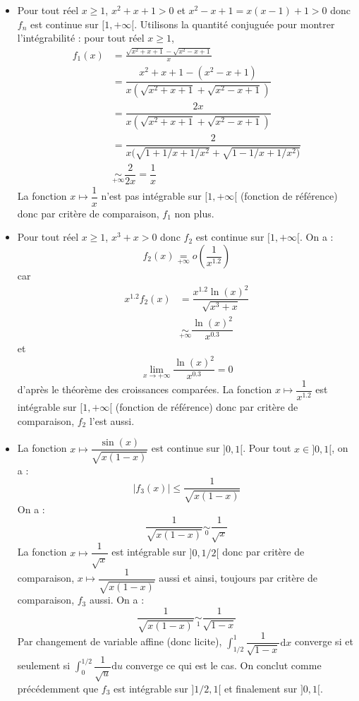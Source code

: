 \documentclass[a4paper,twoside,french,10pt]{VcCours}
\newcommand{\dx}{\text{d}x}
\begin{document}
\begin{itemize}
\item Pour tout réel $x \geq 1$, $x^2+x+1 > 0$ et $x^2-x+1=x(x-1)+1 >0$ donc $f_n$ est continue sur $[1, + \infty[$. Utilisons la quantité conjuguée pour montrer l'intégrabilité : pour tout réel $x \geq 1$,
\begin{align*}
f_1(x) & =\frac{\sqrt{x^2+x+1}-\sqrt{x^2-x+1}}{x} \\
& = \dfrac{x^2+x+1-(x^2-x+1)}{x(\sqrt{x^2+x+1}+\sqrt{x^2-x+1})} \\
& = \dfrac{2x}{x(\sqrt{x^2+x+1}+\sqrt{x^2-x+1})} \\
& = \dfrac{2}{x(\sqrt{1+1/x+1/x^2}+ \sqrt{1-1/x+1/x^2)}} \\
& \underset{+ \infty}{\sim} \dfrac{2}{2x} = \dfrac{1}{x}
\end{align*}
La fonction $x \mapsto \dfrac{1}{x}$ n'est pas intégrable sur $[1, + \infty[$ (fonction de référence) donc par critère de comparaison, $f_1$ non plus.
\item Pour tout réel $x \geq 1$, $x^3+x>0$ donc $f_2$ est continue sur $[1, + \infty[$. On a :
$$ f_2(x) \underset{+\infty}{=} o \left( \dfrac{1}{x^{1.2}} \right)$$
car 
\begin{align*}
x^{1.2} f_2(x) & = \dfrac{x^{1.2} \ln(x)^2}{\sqrt{x^3+x}} \\
&  \underset{+ \infty}{\sim} \dfrac{\ln(x)^2}{x^{0.3}} 
\end{align*}
et 
$$ \lim_{x \rightarrow + \infty} \dfrac{\ln(x)^2}{x^{0.3}}  = 0$$
d'après le théorème des croissances comparées. La fonction $x \mapsto \dfrac{1}{x^{1.2}}$ est intégrable sur $[1, + \infty[$ (fonction de référence) donc par critère de comparaison, $f_2$ l'est aussi.
\item La fonction $x \mapsto \dfrac{\sin(x)}{\sqrt{x(1-x)}}$ est continue sur $]0,1[$. Pour tout $x \in ]0,1[$, on a :
$$ \vert f_3(x) \vert \leq \dfrac{1}{\sqrt{x(1-x)}}$$
On a :
$$ \dfrac{1}{\sqrt{x(1-x)}} \underset{0}{\sim} \dfrac{1}{\sqrt{x}}$$
La fonction $x \mapsto\dfrac{1}{\sqrt{x}}$ est intégrable sur $]0,1/2[$ donc par critère de comparaison, $x \mapsto \dfrac{1}{\sqrt{x(1-x)}}$ aussi et ainsi, toujours par critère de comparaison, $f_3$ aussi. On a :
$$  \dfrac{1}{\sqrt{x(1-x)}} \underset{1}{\sim} \dfrac{1}{\sqrt{1-x}}$$
Par changement de variable affine (donc licite), $\int_{1/2}^1 \dfrac{1}{\sqrt{1-x}} \dx$ converge si et seulement si $\int_{0}^{1/2} \dfrac{1}{\sqrt{u}} \textrm{d}u$ converge ce qui est le cas. On conclut comme précédemment que $f_3$ est intégrable sur $]1/2,1[$ et finalement sur $]0,1[$.

\end{itemize}
\end{document}
